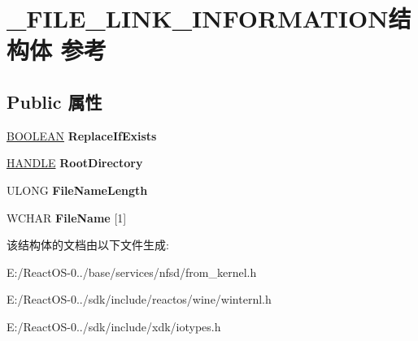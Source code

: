 \hypertarget{struct___f_i_l_e___l_i_n_k___i_n_f_o_r_m_a_t_i_o_n}{}\section{\+\_\+\+F\+I\+L\+E\+\_\+\+L\+I\+N\+K\+\_\+\+I\+N\+F\+O\+R\+M\+A\+T\+I\+O\+N结构体 参考}
\label{struct___f_i_l_e___l_i_n_k___i_n_f_o_r_m_a_t_i_o_n}
\subsection*{Public 属性}
\begin{DoxyCompactItemize}
\item 
\mbox{\label{struct___f_i_l_e___l_i_n_k___i_n_f_o_r_m_a_t_i_o_n_a1fb0581286b360616d77e84107d72cb4}} 
\hyperlink{_processor_bind_8h_a112e3146cb38b6ee95e64d85842e380a}{B\+O\+O\+L\+E\+AN} {\bfseries Replace\+If\+Exists}
\item 
\mbox{\label{struct___f_i_l_e___l_i_n_k___i_n_f_o_r_m_a_t_i_o_n_a21f7e9d07bf1147b69c24161ab2fac16}} 
\hyperlink{interfacevoid}{H\+A\+N\+D\+LE} {\bfseries Root\+Directory}
\item 
\mbox{\label{struct___f_i_l_e___l_i_n_k___i_n_f_o_r_m_a_t_i_o_n_aa906d184c0caef0fa0f7bd67c57cd37e}} 
U\+L\+O\+NG {\bfseries File\+Name\+Length}
\item 
\mbox{\label{struct___f_i_l_e___l_i_n_k___i_n_f_o_r_m_a_t_i_o_n_af9a85c8c681d3b917e23ce4bd4f4b0de}} 
W\+C\+H\+AR {\bfseries File\+Name} \mbox{[}1\mbox{]}
\end{DoxyCompactItemize}


该结构体的文档由以下文件生成\+:\begin{DoxyCompactItemize}
\item 
E\+:/\+React\+O\+S-\/0../base/services/nfsd/from\+\_\+kernel.\+h\item 
E\+:/\+React\+O\+S-\/0../sdk/include/reactos/wine/winternl.\+h\item 
E\+:/\+React\+O\+S-\/0../sdk/include/xdk/iotypes.\+h\end{DoxyCompactItemize}
